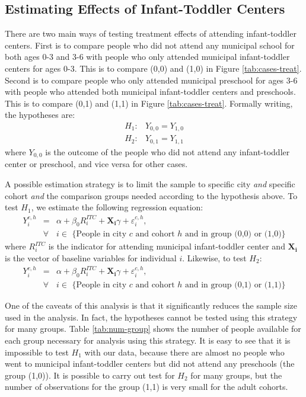 \subsection{Estimating Effects of Infant-Toddler Centers}
There are two main ways of testing treatment effects of attending infant-toddler centers. First is to compare people who did not attend any municipal school for both ages 0-3 and 3-6 with people who only attended municipal infant-toddler centers for ages 0-3. This is to compare (0,0) and (1,0) in Figure \ref{tab:cases-treat}. Second is to compare people who only attended municipal preschool for ages 3-6 with people who attended both municipal infant-toddler centers and preschools. This is to compare (0,1) and (1,1) in Figure \ref{tab:cases-treat}. Formally writing, the hypotheses are:
\begin{eqnarray}
H_1: &  Y_{0,0} = Y_{1,0} \\ 
H_2: &  Y_{0,1} = Y_{1,1} 
\end{eqnarray}
where $Y_{0,0}$ is the outcome of the people who did not attend any infant-toddler center or preschool, and vice versa for other cases. 

A possible estimation strategy is to limit the sample to specific city \textit{and} specific cohort \textit{and} the comparison groups needed according to the hypothesis above. To test $H_1$, we estimate the following regression equation:
\begin{eqnarray}
Y_{i}^{c,h} & = & \alpha + \beta_{0}R_i^{ITC} + \mathbf{X_i}\gamma + \varepsilon_{i}^{c,h}, \\ \nonumber
& \forall & i \in \text{ \{People in city $c$ and cohort $h$ and in group (0,0) or (1,0)\}}
\end{eqnarray}
where $R_i^{ITC}$ is the indicator for attending municipal infant-toddler center and $\mathbf{X_i}$ is the vector of baseline variables for individual $i$. Likewise, to test $H_2$:
\begin{eqnarray}
Y_{i}^{c,h} & = & \alpha + \beta_{0}R_i^{ITC} + \mathbf{X_i}\gamma + \varepsilon_{i}^{c,h}, \\ \nonumber
& \forall & i \in \text{ \{People in city $c$ and cohort $h$ and in group (0,1) or (1,1)\}}
\end{eqnarray}

One of the caveats of this analysis is that it significantly reduces the sample size used in the analysis. In fact, the hypotheses cannot be tested using this strategy for many groups. Table \ref{tab:num-group} shows the number of people available for each group necessary for analysis using this strategy. It is easy to see that it is impossible to test $H_1$ with our data, because there are almost no people who went to municipal infant-toddler centers but did not attend any preschools (the group (1,0)). It is possible to carry out test for $H_2$ for many groups, but the number of observations for the group (1,1) is very small for the adult cohorts. 

